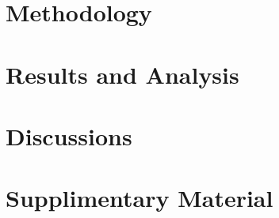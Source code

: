\documentclass[11pt]{book}
\begin{document}
\chapter{Methodology}
\label{ch:methodology}



\chapter{Results and Analysis}
\label{ch:results_and_analysis}



\chapter{Discussions}
\label{ch:conc}



\chapter{Supplimentary Material}
\label{ch:supp_mat}




{}

% 
% 
% 
% 
\end{document}
